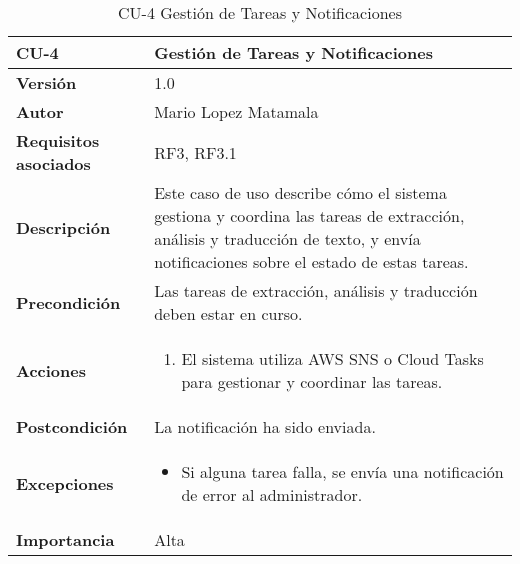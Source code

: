 \begin{table}[p]
\centering
\begin{tabularx}{\linewidth}{ p{} p{} }
\toprule
\textbf{CU-4} & \textbf{Gestión de Tareas y Notificaciones} \\
\toprule
\textbf{Versión} & 1.0 \\
\textbf{Autor} & Mario Lopez Matamala \\
\textbf{Requisitos asociados} & RF3, RF3.1 \\
\textbf{Descripción} & Este caso de uso describe cómo el sistema gestiona y coordina las tareas de extracción, análisis y traducción de texto, y envía notificaciones sobre el estado de estas tareas. \\
\textbf{Precondición} & Las tareas de extracción, análisis y traducción deben estar en curso. \\
\textbf{Acciones} &
\begin{enumerate}
\def\labelenumi{\arabic{enumi}.}
\tightlist
\item El sistema utiliza AWS SNS o Cloud Tasks para gestionar y coordinar las tareas.
\end{enumerate} \\
\textbf{Postcondición} & La notificación ha sido enviada. \\
\textbf{Excepciones} &
\begin{itemize}
\item Si alguna tarea falla, se envía una notificación de error al administrador.
\end{itemize} \\
\textbf{Importancia} & Alta \\
\bottomrule
\end{tabularx}
\caption{CU-4 Gestión de Tareas y Notificaciones}
\label{tab:cu4}
\end{table}

\vspace{1cm}

